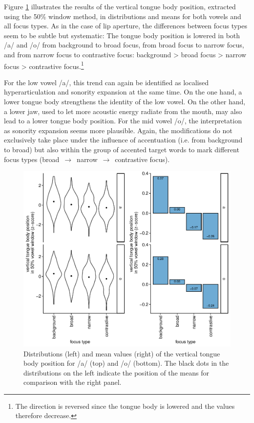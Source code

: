 Figure \ref{fig:tboy} illustrates the results of the vertical tongue body position, extracted using the 50\% window method, in distributions and means for both vowels and all focus types. As in the case of lip aperture, the differences between focus types seem to be subtle but systematic: The tongue body position is lowered in both /a/ and /o/ from background to broad focus, from broad focus to narrow focus, and from narrow focus to contrastive focus: background > broad focus > narrow focus > contrastive focus.\footnote{The direction is reversed since the tongue body is lowered and the values therefore decrease.}

For the low vowel /a/, this trend can again be identified as localised hyperarticulation and sonority expansion at the same time. On the one hand, a lower tongue body strengthens the identity of the low vowel. On the other hand, a lower jaw, used to let more acoustic energy radiate from the mouth, may also lead to a lower tongue body position. For the mid vowel /o/, the interpretation as sonority expansion seems more plausible. Again, the modifications do not exclusively take place under the influence of accentuation (i.e. from background to broad) but also within the group of accented target words to mark different focus types (broad $\,\to\,$ narrow $\,\to\,$ contrastive focus).

\begin{figure}
\includegraphics[width=\textwidth]{figures/ch7/tboy.pdf}
\caption[Distributions and mean values of the vertical tongue body position.]{Distributions (left) and mean values (right) of the vertical tongue body position for /a/ (top) and /o/ (bottom). The black dots in the distributions on the left indicate the position of the means for comparison with the right panel.}
\label{fig:tboy}
\end{figure}

